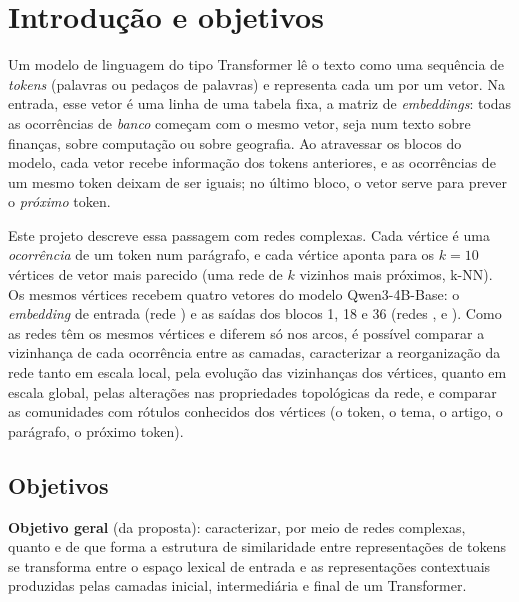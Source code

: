 \section{Introdução e objetivos}\label{sec:introducao}

Um modelo de linguagem do tipo Transformer lê o texto como uma sequência de \emph{tokens}
(palavras ou pedaços de palavras) e representa cada um por um vetor. Na entrada, esse vetor é
uma linha de uma tabela fixa, a matriz de \emph{embeddings}: todas as ocorrências de
\emph{banco} começam com o mesmo vetor, seja num texto sobre finanças, sobre computação ou
sobre geografia. Ao atravessar os blocos do modelo, cada vetor recebe informação dos tokens
anteriores, e as ocorrências de um mesmo token deixam de ser iguais; no último bloco, o vetor
serve para prever o \emph{próximo} token.

Este projeto descreve essa passagem com redes complexas. Cada vértice é uma \emph{ocorrência}
de um token num parágrafo, e cada vértice aponta para os $k=10$ vértices de vetor mais parecido
(uma rede de $k$ vizinhos mais próximos, k-NN). Os mesmos vértices recebem quatro vetores do
modelo Qwen3-4B-Base: o \emph{embedding} de entrada (rede ) e as saídas dos blocos 1,
18 e 36 (redes ,  e ). Como as redes têm os mesmos vértices e
diferem só nos arcos, é possível comparar a vizinhança de cada ocorrência entre as camadas,
caracterizar a reorganização da rede tanto em escala local, pela evolução das vizinhanças dos
vértices, quanto em escala global, pelas alterações nas propriedades topológicas da rede, e comparar as
comunidades com rótulos conhecidos dos vértices (o token, o tema, o artigo, o parágrafo, o
próximo token).

\subsection{Objetivos}\label{sec:objetivos-def}

\textbf{Objetivo geral} (da proposta): caracterizar, por meio de redes complexas, quanto e de
que forma a estrutura de similaridade entre representações de tokens se transforma entre o
espaço lexical de entrada e as representações contextuais produzidas pelas camadas inicial,
intermediária e final de um Transformer.

